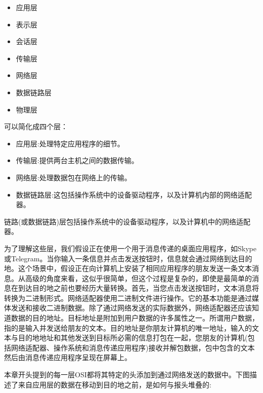 \begin{itemize}
	\item 应用层
	\item 表示层
	\item 会话层
	\item 传输层
	\item 网络层
	\item 数据链路层
	\item 物理层
\end{itemize}

可以简化成四个层： \par

\begin{itemize}
	\item 应用层:处理特定应用程序的细节。
	\item 传输层:提供两台主机之间的数据传输。
	\item 网络层:处理数据包在网络上的传输。
	\item 数据链路层:这包括操作系统中的设备驱动程序，以及计算机内部的网络适配器。
\end{itemize}

链路(或数据链路)层包括操作系统中的设备驱动程序，以及计算机中的网络适配器。 \par
为了理解这些层，我们假设正在使用一个用于消息传递的桌面应用程序，如Skype或Telegram。当你输入一条信息并点击发送按钮时，信息就会通过网络到达目的地。这个场景中，假设正在向计算机上安装了相同应用程序的朋友发送一条文本消息。从高级的角度来看，这似乎很简单，但这个过程是复杂的，即使是最简单的消息在到达目的地之前也要经历大量转换。首先，当您点击发送按钮时，文本消息将转换为二进制形式。网络适配器使用二进制文件进行操作。它的基本功能是通过媒体发送和接收二进制数据。除了通过网络发送的实际数据外，网络适配器还应该知道数据的目的地址。目标地址是附加到用户数据的许多属性之一。所谓用户数据，指的是输入并发送给朋友的文本。目的地址是你朋友计算机的唯一地址，输入的文本与目的地地址和其他发送到目标所必需的信息打包在一起，您朋友的计算机(包括网络适配器、操作系统和消息传递应用程序)接收并解包数据，包中包含的文本然后由消息传递应用程序呈现在屏幕上。 \par
本章开头提到的每一层OSI都将其特定的头添加到通过网络发送的数据中。下图描述了来自应用层的数据在移动到目的地之前，是如何与报头堆叠的: \par


